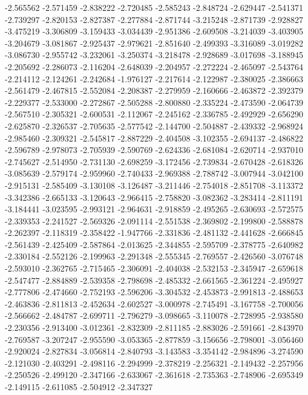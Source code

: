 -2.565562
-2.571459
-2.838222
-2.720485
-2.585243
-2.848724
-2.629447
-2.541371
-2.739297
-2.820153
-2.827387
-2.277884
-2.871744
-3.215248
-2.871739
-2.928827
-3.475219
-3.306809
-3.159433
-3.034439
-2.951386
-2.609508
-3.214039
-3.403905
-3.204679
-3.081867
-2.925437
-2.979621
-2.851640
-2.499393
-3.316089
-3.019282
-3.086730
-2.955742
-3.232061
-3.250374
-3.218478
-2.928689
-3.017698
-3.188945
-2.205692
-2.286073
-2.116204
-2.648039
-2.204957
-2.272224
-2.465097
-2.543764
-2.214112
-2.124261
-2.242684
-1.976127
-2.217614
-2.122987
-2.380025
-2.386663
-2.561479
-2.467815
-2.552084
-2.208387
-2.279959
-2.160666
-2.463872
-2.392379
-2.229377
-2.533000
-2.272867
-2.505288
-2.800880
-2.335224
-2.473590
-2.064739
-2.567510
-2.305321
-2.600531
-2.112067
-2.245162
-2.336785
-2.492929
-2.656290
-2.625870
-2.326537
-2.705635
-2.577542
-2.144700
-2.504887
-2.439332
-2.968924
-2.985460
-2.309321
-2.545817
-2.887229
-2.404508
-3.102355
-2.694137
-2.486822
-2.596789
-2.978073
-2.705939
-2.590769
-2.624336
-2.681084
-2.620714
-2.937010
-2.745627
-2.514950
-2.731130
-2.698259
-3.172456
-2.739834
-2.670428
-2.618326
-3.085639
-2.579174
-2.959960
-2.740433
-2.969388
-2.788742
-3.007944
-3.042100
-2.915131
-2.585409
-3.130108
-3.126487
-3.211446
-2.754018
-2.851708
-3.113372
-3.342386
-2.665133
-3.120643
-2.966415
-2.758820
-3.082362
-3.283414
-2.811191
-3.184441
-3.023595
-2.993121
-2.964631
-2.918859
-2.495265
-2.630693
-2.572575
-2.339353
-2.241527
-2.569326
-2.091114
-2.551538
-2.369802
-2.199800
-2.588878
-2.262397
-2.118319
-2.358422
-1.947766
-2.331836
-2.481132
-2.441628
-2.666845
-2.561439
-2.425409
-2.587864
-2.013625
-2.344855
-2.595709
-2.378775
-2.640982
-2.330184
-2.552126
-2.199963
-2.291348
-2.555345
-2.769557
-2.426560
-3.076748
-2.593010
-2.362765
-2.715465
-2.306091
-2.404038
-2.532153
-2.345947
-2.659618
-2.547477
-2.884889
-2.539358
-2.798698
-2.485332
-2.661565
-2.361224
-2.495927
-2.777806
-2.474660
-2.752193
-2.596206
-3.304532
-2.453873
-2.991813
-2.488653
-2.463836
-2.811813
-2.452634
-2.602527
-3.000978
-2.745491
-3.167758
-2.700056
-2.566662
-2.484787
-2.699711
-2.796279
-3.098665
-3.110078
-2.728995
-2.938580
-2.230356
-2.913400
-3.012361
-2.832309
-2.811185
-2.883026
-2.591661
-2.843970
-2.769587
-3.207247
-2.955590
-3.053365
-2.877859
-3.156656
-2.798001
-3.056460
-2.920024
-2.827834
-3.056814
-2.840793
-3.143583
-3.354142
-2.984896
-3.274590
-2.121030
-2.403291
-2.498116
-2.294999
-2.378219
-2.256321
-2.149432
-2.257956
-2.250526
-2.499120
-2.347166
-2.633067
-2.361618
-2.735363
-2.748906
-2.695349
-2.149115
-2.611085
-2.504912
-2.347327
